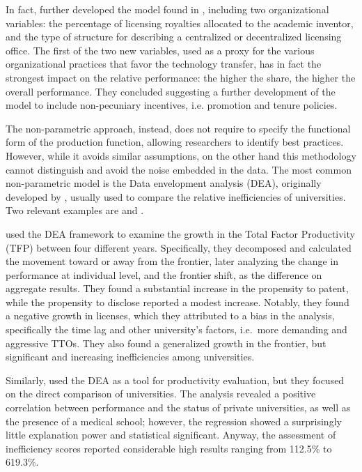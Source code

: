 In fact, \citet{Link2005} further developed the model found in \citet{Siegel2003a}, including two organizational variables: the percentage of licensing royalties allocated to the academic inventor, and the type of structure for describing a centralized or decentralized licensing office. The first of the two new variables, used as a proxy for the various organizational practices that favor the technology transfer, has in fact the strongest impact on the relative performance: the higher the share, the higher the overall performance. They concluded suggesting a further development of the model to include non-pecuniary incentives, i.e. promotion and tenure policies. 

The non-parametric approach, instead, does not require to specify the functional form of the production function, allowing researchers to identify best practices. However, while it avoids similar assumptions, on the other hand this methodology cannot distinguish and avoid the noise embedded in the data. The most common non-parametric model is the Data envelopment analysis (DEA), originally developed by \citet{Fare1993}, usually used to compare the relative inefficiencies of universities. Two relevant examples are \citet{Thursby2002} and \citet{Anderson2007}.

\citet{Thursby2002} used the DEA framework to examine the growth in the Total Factor Productivity (TFP) between four different years. Specifically, they decomposed and calculated the movement toward or away from the frontier, later analyzing the change in performance at individual level, and the frontier shift, as the difference on aggregate results. They found a substantial increase in the propensity to patent, while the propensity to disclose reported a modest increase. Notably, they found a negative growth in licenses, which they attributed to a bias in the analysis, specifically the time lag and other university's factors, i.e.\ more demanding and aggressive TTOs. They also found a generalized growth in the frontier, but significant and increasing inefficiencies among universities.

Similarly, \citet{Anderson2007} used the DEA as a tool for productivity evaluation, but they focused on the direct comparison of universities. The analysis revealed a positive correlation between performance and the status of private universities, as well as the presence of a medical school; however, the regression showed a surprisingly little explanation power and statistical significant. Anyway, the assessment of inefficiency scores reported considerable high results ranging from 112.5\% to 619.3\%.

